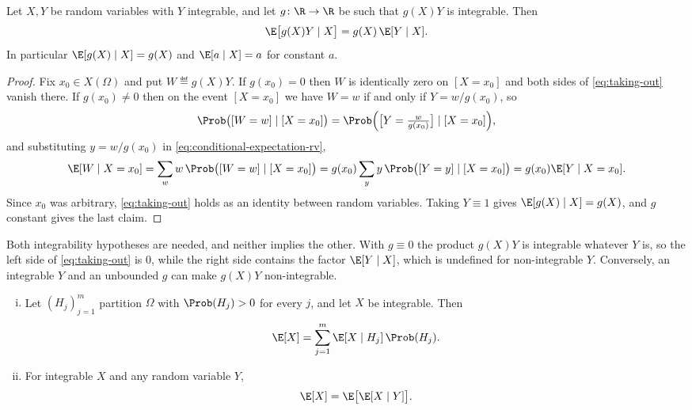\begin{proposition}\label{prop:taking-out}
	Let $X,Y$ be random variables with $Y$ integrable, and let
	$g\colon\R\to\R$ be such that $g(X)Y$ is integrable. Then
	\begin{equation}\label{eq:taking-out}
		\E\bigl[g(X)Y\mid X\bigr]=g(X)\,\E[Y\mid X] .
	\end{equation}
	In particular $\E[g(X)\mid X]=g(X)$ and $\E[a\mid X]=a$ for constant $a$.
\end{proposition}

\begin{proof}
	Fix $x_0\in X(\Omega)$ and put $W\eqdef g(X)Y$. If $g(x_0)=0$ then
	$W$ is identically zero on $[X=x_0]$ and both sides of \eqref{eq:taking-out}
	vanish there. If $g(x_0)\neq0$ then on the event $[X=x_0]$ we have
	$W=w$ if and only if $Y=w/g(x_0)$, so
	\[
		\Prob\bigl([W=w]\mid[X=x_0]\bigr)
		=\Prob\Bigl(\bigl[Y=\tfrac{w}{g(x_0)}\bigr]\mid[X=x_0]\Bigr),
	\]
	and substituting $y=w/g(x_0)$ in \eqref{eq:conditional-expectation-rv},
	\[
		\E[W\mid X=x_0]=\sum_{w}w\,\Prob\bigl([W=w]\mid[X=x_0]\bigr)
		=g(x_0)\sum_{y}y\,\Prob\bigl([Y=y]\mid[X=x_0]\bigr)
		=g(x_0)\E[Y\mid X=x_0].
	\]
	Since $x_0$ was arbitrary, \eqref{eq:taking-out} holds as an identity between
	random variables. Taking $Y\equiv1$ gives $\E[g(X)\mid X]=g(X)$, and $g$
	constant gives the last claim.
\end{proof}

Both integrability hypotheses are needed, and neither implies the other. With
$g\equiv0$ the product $g(X)Y$ is integrable whatever $Y$ is, so the left side
of \eqref{eq:taking-out} is $0$, while the right side contains the factor
$\E[Y\mid X]$, which is undefined for non-integrable $Y$. Conversely, an
integrable $Y$ and an unbounded $g$ can make $g(X)Y$ non-integrable.

\begin{theorem}\label{thm:lie}
	\begin{enumerate}[(i)]
		\item Let $(H_j)_{j=1}^{m}$ partition $\Omega$ with $\Prob(H_j)>0$ for every
		      $j$, and let $X$ be integrable. Then
		      \begin{equation}\label{eq:lie-partition}
			      \E[X]=\sum_{j=1}^{m}\E[X\mid H_j]\,\Prob(H_j).
		      \end{equation}
		\item For integrable $X$ and any random variable $Y$,
		      \begin{equation}\label{eq:lie}
			      \E[X]=\E\bigl[\E[X\mid Y]\bigr].
		      \end{equation}
	\end{enumerate}
\end{theorem}

